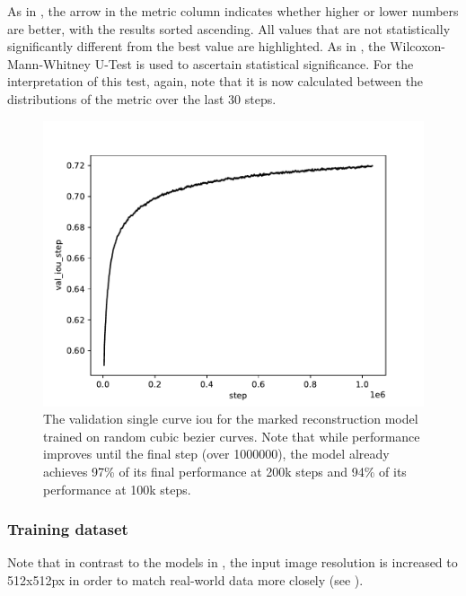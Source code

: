 As in , the arrow in the metric column indicates whether higher or lower numbers are better, with the results sorted ascending. All values that are not statistically significantly different from the best value are highlighted. As in , the Wilcoxon-Mann-Whitney U-Test \citep{c4091bd3-d888-3152-8886-c284bf66a93a,10.1214/aoms/1177730491} is used to ascertain statistical significance. For the interpretation of this test, again, note that it is now calculated between the distributions of the metric over the last 30 steps.

\begin{figure}
    \centering
    \includegraphics[height=.2\textheight]{graphics/work-artifacts/version_107/val_iou_step_full.pdf}
    \caption{The validation single curve \gls{iou} for the marked reconstruction model trained on random cubic bezier curves. Note that while performance improves until the final step (over \num{1000000}), the model already achieves 97\% of its final performance at 200k steps and 94\% of its performance at 100k steps.}
    \label{fig:work-artifact-107-val-iou-full}
\end{figure}

\subsubsection{Training dataset}

Note that in contrast to the models in , the input image resolution is increased to 512x512px in order to match real-world data more closely (see ).

